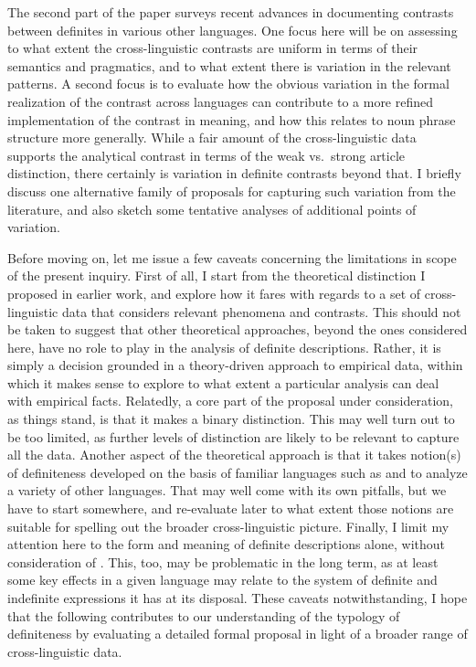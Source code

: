 \documentclass[output=paper
,modfonts
,nonflat]{langscibook}
\begin{document}
The second part of the paper surveys recent
advances in documenting contrasts between definites in various other
languages. One focus here will be on assessing to what extent the
cross-linguistic contrasts are uniform in terms of their semantics and
pragmatics, and to what extent there is variation in the relevant
patterns.  A second focus is to evaluate how the obvious variation in the formal
realization of the contrast across languages can contribute to a more
refined implementation of the contrast in meaning, and how this
relates to noun phrase structure more generally. While a fair amount of the
cross-linguistic data supports the analytical contrast in terms of the
weak vs.\ strong article distinction, there certainly is variation
in definite contrasts beyond that. I briefly discuss one alternative family of
proposals for capturing such variation from the literature, and also
sketch some tentative analyses of additional points of variation. 

Before moving on, let me issue a few caveats concerning the
limitations in scope of
the present inquiry. First of all, I start from the theoretical
distinction I proposed in earlier work, and explore how it fares with
regards to a set of cross-linguistic data that considers relevant
phenomena and contrasts. This should not be taken to suggest that
other theoretical approaches, beyond the ones considered here, have no
role to play in the analysis of definite descriptions. Rather, it is
simply a decision grounded in a theory-driven approach to empirical data, within
which it makes sense to explore to what extent a particular analysis
can deal with empirical facts. Relatedly, a core part of the proposal under
consideration, as things stand, is that it makes a binary
distinction. This may well turn out to be too limited, as further
levels of distinction are likely to be relevant to capture all the
data. Another aspect of the theoretical approach is that it takes
notion(s) of definiteness developed on the basis of familiar languages
such as  and  to analyze a variety of other
languages. That may well come with its own pitfalls, but we have to start somewhere, and re-evaluate later to what
extent those notions are suitable for spelling out the broader
cross-linguistic picture. Finally, I limit my attention here to the
form and meaning of
definite descriptions alone, without consideration of
. This, too, may be problematic in the long term, as
at least some key effects in a given language may relate to the system
of definite and indefinite expressions it has at its disposal. These
caveats notwithstanding, I hope that the following contributes to our
understanding of the typology of definiteness by evaluating a detailed
formal proposal in light of a broader range of cross-linguistic data.
\end{document}
